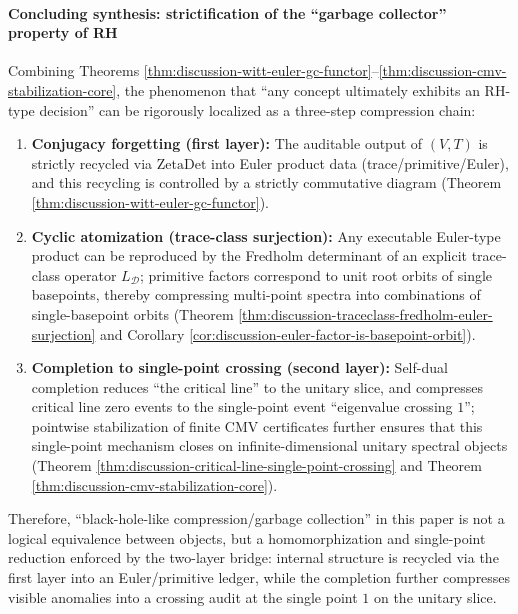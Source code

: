 \paragraph{Concluding synthesis: strictification of the ``garbage collector'' property of RH}
Combining Theorems \ref{thm:discussion-witt-euler-gc-functor}--\ref{thm:discussion-cmv-stabilization-core}, the phenomenon that ``any concept ultimately exhibits an RH-type decision'' can be rigorously localized as a three-step compression chain:
\begin{enumerate}
  \item \textbf{Conjugacy forgetting (first layer):} The auditable output of \((V,T)\) is strictly recycled via \(\mathrm{ZetaDet}\) into Euler product data (trace/primitive/Euler), and this recycling is controlled by a strictly commutative diagram (Theorem \ref{thm:discussion-witt-euler-gc-functor}).
  \item \textbf{Cyclic atomization (trace-class surjection):} Any executable Euler-type product can be reproduced by the Fredholm determinant of an explicit trace-class operator \(L_{\mathcal D}\); primitive factors correspond to unit root orbits of single basepoints, thereby compressing multi-point spectra into combinations of single-basepoint orbits (Theorem \ref{thm:discussion-traceclass-fredholm-euler-surjection} and Corollary \ref{cor:discussion-euler-factor-is-basepoint-orbit}).
  \item \textbf{Completion to single-point crossing (second layer):} Self-dual completion reduces ``the critical line'' to the unitary slice, and compresses critical line zero events to the single-point event ``eigenvalue crossing \(1\)''; pointwise stabilization of finite CMV certificates further ensures that this single-point mechanism closes on infinite-dimensional unitary spectral objects (Theorem \ref{thm:discussion-critical-line-single-point-crossing} and Theorem \ref{thm:discussion-cmv-stabilization-core}).
\end{enumerate}
Therefore, ``black-hole-like compression/garbage collection'' in this paper is not a logical equivalence between objects, but a homomorphization and single-point reduction enforced by the two-layer bridge: internal structure is recycled via the first layer into an Euler/primitive ledger, while the completion further compresses visible anomalies into a crossing audit at the single point \(1\) on the unitary slice.

\endinput
